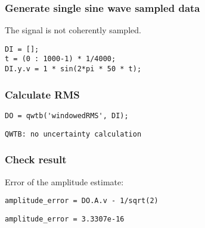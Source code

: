 \startcontents[localtoc]



{}
\subsubsection*{Generate single sine wave sampled data}



The signal is not coherently sampled.

\begin{lstlisting}
DI = [];
t = (0 : 1000-1) * 1/4000;
DI.y.v = 1 * sin(2*pi * 50 * t);
\end{lstlisting}


{}
\subsubsection*{Calculate RMS}

\begin{lstlisting}
DO = qwtb('windowedRMS', DI);
\end{lstlisting}
\begin{lstlisting}[language={},xleftmargin=5pt,frame=none]
QWTB: no uncertainty calculation

\end{lstlisting}


{}
\subsubsection*{Check result}



Error of the amplitude estimate:

\begin{lstlisting}
amplitude_error = DO.A.v - 1/sqrt(2)
\end{lstlisting}
\begin{lstlisting}[language={},xleftmargin=5pt,frame=none]
amplitude_error = 3.3307e-16

\end{lstlisting}


{}
